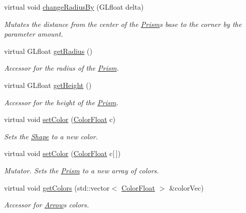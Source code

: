 \begin{DoxyCompactItemize}
virtual void \hyperlink{classtsgl_1_1_prism_ae16f2d46d3fb263d389bfcc2a45bda63}{change\+Radius\+By} (G\+Lfloat delta)
\begin{DoxyCompactList}\small\item\em Mutates the distance from the center of the \hyperlink{classtsgl_1_1_prism}{Prism}\textquotesingle{}s base to the corner by the parameter amount. \end{DoxyCompactList}\item 
virtual G\+Lfloat \hyperlink{classtsgl_1_1_prism_a65f06653960000dc544a0348fe979171}{get\+Radius} ()
\begin{DoxyCompactList}\small\item\em Accessor for the radius of the \hyperlink{classtsgl_1_1_prism}{Prism}. \end{DoxyCompactList}\item 
virtual G\+Lfloat \hyperlink{classtsgl_1_1_prism_a5a62be4c54080aa3171d8bf9a2d9caf0}{get\+Height} ()
\begin{DoxyCompactList}\small\item\em Accessor for the height of the \hyperlink{classtsgl_1_1_prism}{Prism}. \end{DoxyCompactList}\item 
virtual void \hyperlink{classtsgl_1_1_prism_af2c681fd9cf74eaede3dd4fd8dd10625}{set\+Color} (\hyperlink{structtsgl_1_1_color_float}{Color\+Float} c)
\begin{DoxyCompactList}\small\item\em Sets the \hyperlink{classtsgl_1_1_shape}{Shape} to a new color. \end{DoxyCompactList}\item 
virtual void \hyperlink{classtsgl_1_1_prism_a668c2779da173493efc0c4634750bd66}{set\+Color} (\hyperlink{structtsgl_1_1_color_float}{Color\+Float} c\mbox{[}$\,$\mbox{]})
\begin{DoxyCompactList}\small\item\em Mutator. Sets the \hyperlink{classtsgl_1_1_prism}{Prism} to a new array of colors. \end{DoxyCompactList}\item 
virtual void \hyperlink{classtsgl_1_1_prism_abfdc091d8c61e889f61b71577b58e0b6}{get\+Colors} (std\+::vector$<$ \hyperlink{structtsgl_1_1_color_float}{Color\+Float} $>$ \&color\+Vec)
\begin{DoxyCompactList}\small\item\em Accessor for \hyperlink{classtsgl_1_1_arrow}{Arrow}\textquotesingle{}s colors. \end{DoxyCompactList}\end{DoxyCompactItemize}
